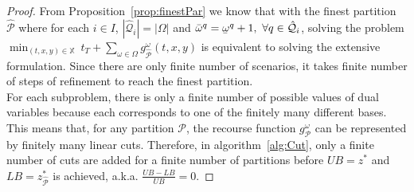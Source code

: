 \documentclass[11pt]{article}
\renewcommand{\underbar}{\underaccent{\bar}}
\begin{document}
	\begin{proof}
		From Proposition~\ref{prop:finestPar} we know that with the finest partition \(\hat{\mathcal{P}}\) where for each \(i \in I\), \(|\hat{\mathcal{Q}}_i| = |\Omega|\) and \(\bar{\omega}^q = \underbar{\omega}^q + 1,\ \forall q \in \hat{\mathcal{Q}}_i\), solving the problem \(\min_{(t,x,y) \in \mathbb{X}}\ t_T + \sum_{\omega \in \Omega} g^\omega_{\hat{\mathcal{P}}}(t,x,y)\) is equivalent to solving the extensive formulation. Since there are only finite number of scenarios, it takes finite number of steps of refinement to reach the finest partition. \\
		\newline
		For each subproblem, there is only a finite number of possible values of dual variables because each corresponds to one of the finitely many different bases. This means that, for any partition \(\mathcal{P}\), the recourse function \(g^\omega_{\mathcal{P}}\) can be represented by finitely many linear cuts. Therefore, in algorithm~\ref{alg:Cut}, only a finite number of cuts are added for a finite number of partitions before \(UB = z^*\) and \(LB = z^*_{\hat{\mathcal{P}}}\) is achieved, a.k.a. \(\frac{UB - LB}{UB} = 0\).
	\end{proof}
\end{document}
